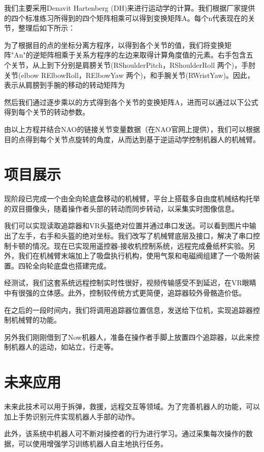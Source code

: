 我们主要采用Denavit Hartenberg (DH)来进行运动学的计算。我们根据厂家提供的四个标准练习所得到的四个矩阵相乘可以得到变换矩阵A。每个n代表现在的关节，整理后如下所示：

为了根据目的点的坐标分离方程序，以得到各个关节的值，我们将变换矩阵"An"的逆矩阵相乘于关系方程序的左边来取得计算角度值的元素。右手包含五个关节，从上到下分别是肩膀关节(RShoulderPitch，RShoulderRoll 两个)，手肘关节(elbow RElbowRoll，RElbowYaw 两个)，和手腕关节(RWristYaw)。因此，表示从肩膀到手腕的移动的转动矩阵为

然后我们通过逐步乘以的方式得到各个关节的变换矩阵A，进而可以通过以下公式得到每个关节的转动参数。

由以上方程并结合NAO的链接关节变量数据（在NAO官网上提供），我们可以根据目的点得到每个关节点旋转的角度，从而达到基于逆运动学控制机器人的机械臂。



\chapter{项目展示}

现阶段已完成一个由全向轮底盘移动的机械臂，平台上搭载多自由度机械结构托举的双目摄像头，随着操作者头部的转动而同步转动，以采集实时图像信息。

我们可以实现读取追踪器和VR头盔绝对位置并通过串口发送。可以看到图片中输出了左手，右手和头盔的绝对坐标。我们改写了机械臂底层及接口，解决了串口控制卡顿的情况。现在已实现用遥控器-接收机控制系统，远程完成叠纸杯实验。另外，我们在机械臂末端加上了吸盘执行机构，使用气泵和电磁阀组建了一个吸附装置。四轮全向轮底盘也搭建完成。

经测试，我们这套系统远程控制实时性很好，视频传输感受不到延迟，在VR眼睛中有很强的立体感。此外，控制较传统方式更简便，追踪器较外骨骼造价低。

在之后的一段时间内，我们将调用追踪器位置信息，发送给下位机，实现追踪器控制机械臂的功能。

另外我们刚刚借到了Now机器人，准备在操作者手脚上放置四个追踪器，以此来控制机器人的运动，如站立，行走等。


\section{}

\section{}



\chapter{未来应用}
未来此技术可以用于拆弹，救援，远程交互等领域。为了完善机器人的功能，可以加上手势识别元件实现机器人手部的动作。

此外，该系统中机器人可不断对操控者的行为进行学习。通过采集每次操作的数据，可以使用增强学习训练机器人自主地执行任务。
